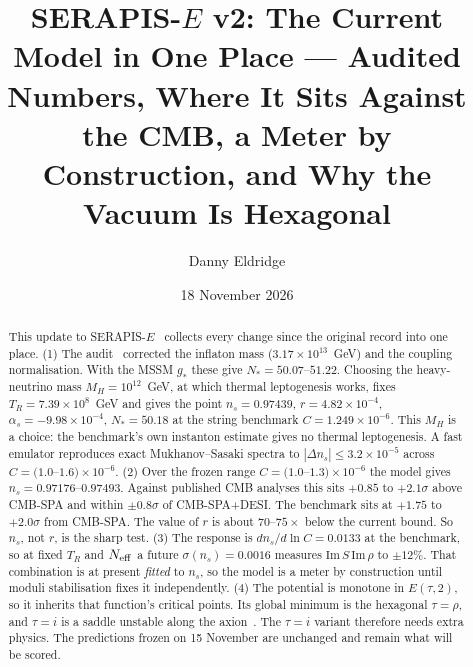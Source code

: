 \documentclass[aps,prd,twocolumn,superscriptaddress,nofootinbib,showkeys]{revtex4-2}
\begin{document}
\title{SERAPIS-$E$ v2: The Current Model in One Place --- Audited Numbers, Where It Sits Against the CMB, a Meter by Construction, and Why the Vacuum Is Hexagonal}
\author{Danny Eldridge}
\date{18 November 2026}
\begin{abstract}
This update to SERAPIS-$E$~\cite{P3} collects every change since the original record into one place. (1) The audit~\cite{P5} corrected the inflaton mass ($3.17\times10^{13}$~GeV) and the coupling normalisation. With the MSSM $g_*$ these give $N_*=50.07$--$51.22$. Choosing the heavy-neutrino mass $M_H=10^{12}$~GeV, at which thermal leptogenesis works, fixes $T_R=7.39\times10^8$~GeV and gives the point $n_s=0.97439$, $r=4.82\times10^{-4}$, $\alpha_s=-9.98\times10^{-4}$, $N_*=50.18$ at the string benchmark $C=1.249\times10^{-6}$. This $M_H$ is a choice: the benchmark's own instanton estimate gives no thermal leptogenesis. A fast emulator reproduces exact Mukhanov--Sasaki spectra to $|\Delta n_s|\le3.2\times10^{-5}$ across $C=(1.0$--$1.6)\times10^{-6}$. (2) Over the frozen range $C=(1.0$--$1.3)\times10^{-6}$ the model gives $n_s=0.97176$--$0.97493$. Against published CMB analyses this sits $+0.85$ to $+2.1\sigma$ above CMB-SPA and within $\pm0.8\sigma$ of CMB-SPA+DESI. The benchmark sits at $+1.75$ to $+2.0\sigma$ from CMB-SPA. The value of $r$ is about $70$--$75\times$ below the current bound. So $n_s$, not $r$, is the sharp test. (3) The response is $dn_s/d\ln C=0.0133$ at the benchmark, so at fixed $T_R$ and $N_{\rm eff}$ a future $\sigma(n_s)=0.0016$ measures $\mathrm{Im}\,S\,\mathrm{Im}\,\rho$ to $\pm12\%$. That combination is at present \emph{fitted} to $n_s$, so the model is a meter by construction until moduli stabilisation fixes it independently. (4) The potential is monotone in $E(\tau,2)$, so it inherits that function's critical points. Its global minimum is the hexagonal $\tau=\rho$, and $\tau=i$ is a saddle unstable along the axion~\cite{P6}. The $\tau=i$ variant therefore needs extra physics. The predictions frozen on 15 November are unchanged and remain what will be scored.
\end{abstract}
\maketitle
\end{document}
